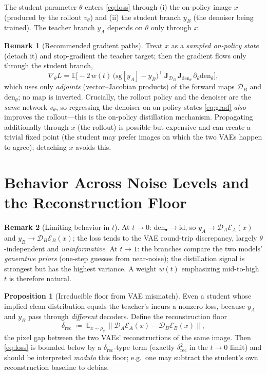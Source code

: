 \documentclass[11pt,a4paper]{article}
\newcommand{\E}{\mathbb{E}}
\newcommand{\sg}{\mathrm{sg}}
\newcommand{\Enc}{\mathcal{E}}
\newcommand{\Dec}{\mathcal{D}}
\newcommand{\den}{\mathrm{den}}
\newcommand{\Jac}{\mathbf{J}}
\newcommand{\norm}[1]{\left\lVert #1 \right\rVert}
\theoremstyle{definition}
\newtheorem{proposition}{Proposition}
\newtheorem{remark}{Remark}
\begin{document}
The student parameter $\theta$ enters \eqref{eq:loss} through (i) the on-policy image $x$
(produced by the rollout $v_\theta$) and (ii) the student branch $y_B$ (the denoiser being
trained). The teacher branch $y_A$ depends on $\theta$ only through $x$.

\begin{remark}[Recommended gradient paths]
\label{rem:paths}
Treat $x$ as a \emph{sampled on-policy state} (detach it) and stop-gradient the teacher target;
then the gradient flows only through the student branch,
\begin{equation}
\nabla_\theta L
= \E\Big[-2\,w(t)\,\big(\sg[y_A]-y_B\big)^{\!\top}\,
\Jac_{\Dec_B}\,\Jac_{\den_\theta}\,\partial_\theta\den_\theta\Big],
\label{eq:grad}
\end{equation}
which uses only \emph{adjoints} (vector--Jacobian products) of the forward maps $\Dec_B$ and
$\den_\theta$; no map is inverted. Crucially, the rollout policy and the denoiser are the
\emph{same} network $v_\theta$, so regressing the denoiser on on-policy states \eqref{eq:grad}
\emph{also} improves the rollout---this is the on-policy distillation mechanism. Propagating
additionally through $x$ (the rollout) is possible but expensive and can create a trivial
fixed point (the student may prefer images on which the two VAEs happen to agree); detaching $x$
avoids this.
\end{remark}

\section{Behavior Across Noise Levels and the Reconstruction Floor}
\label{sec:t-behavior}

\begin{remark}[Limiting behavior in $t$]
\label{rem:t-limits}
At $t\to0$: $\den_\bullet\to\mathrm{id}$, so $y_A\to\Dec_A\Enc_A(x)$ and $y_B\to\Dec_B\Enc_B(x)$;
the loss tends to the VAE round-trip discrepancy, largely $\theta$-independent and
\emph{uninformative}. At $t\to1$: the branches compare the two models' \emph{generative priors}
(one-step guesses from near-noise); the distillation signal is strongest but has the highest
variance. A weight $w(t)$ emphasizing mid-to-high $t$ is therefore natural.
\end{remark}

\begin{proposition}[Irreducible floor from VAE mismatch]
\label{prop:floor}
Even a student whose implied clean distribution equals the teacher's incurs a nonzero loss,
because $y_A$ and $y_B$ pass through \emph{different} decoders. Define the reconstruction floor
\begin{equation}
\delta_{\mathrm{rec}}\;\coloneqq\;\E_{x\sim\rho_\theta}\ \norm{\Dec_A\Enc_A(x)-\Dec_B\Enc_B(x)},
\label{eq:floor}
\end{equation}
the pixel gap between the two VAEs' reconstructions of the same image. Then \eqref{eq:loss} is
bounded below by a $\delta_{\mathrm{rec}}$-type term (exactly $\delta_{\mathrm{rec}}^2$ in the
$t\to0$ limit) and should be interpreted \emph{modulo} this floor; e.g.\ one may subtract the
student's own reconstruction baseline to debias.
\end{proposition}
\end{document}
